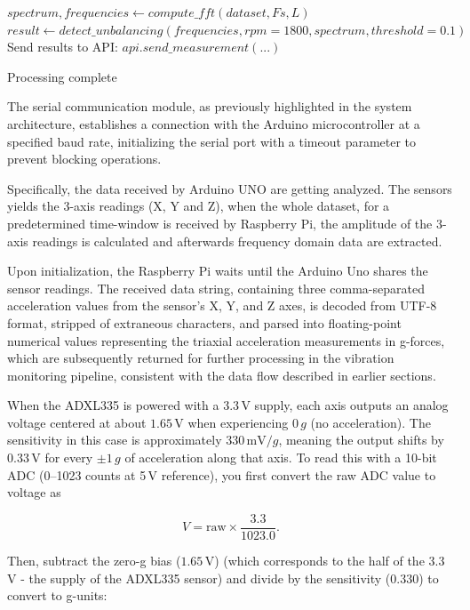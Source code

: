 {\begin{algorithm}[H]
\begin{algorithmic}[1]
			\STATE $spectrum, frequencies \gets compute\_fft(dataset, Fs, L)$
			\STATE $result \gets detect\_unbalancing(frequencies, rpm=1800, spectrum, threshold=0.1)$
			\STATE Send results to API: $api.send\_measurement(...)$
			\ENDFOR
			
			\RETURN Processing complete
		\end{algorithmic}
	\end{algorithm}


	
	The serial communication module, as previously highlighted in the system architecture, establishes a connection with the Arduino microcontroller at a specified baud rate, initializing the serial port with a timeout parameter to prevent blocking operations. 
	
	Specifically, the data received by Arduino UNO are getting analyzed. The sensors yields the 3-axis readings (X, Y and Z), when the whole dataset, for a predetermined time-window is received by Raspberry Pi, the amplitude of the 3-axis readings is calculated and afterwards frequency domain data are extracted.
	
	Upon initialization, the Raspberry Pi waits until the Arduino Uno shares the sensor readings. The received data string, containing three comma-separated acceleration values from the sensor's X, Y, and Z axes, is decoded from UTF-8 format, stripped of extraneous characters, and parsed into floating-point numerical values representing the triaxial acceleration measurements in g-forces, which are subsequently returned for further processing in the vibration monitoring pipeline, consistent with the data flow described in earlier sections.
	
	When the ADXL335 is powered with a 3.3\,V supply, each axis outputs an analog voltage centered at about 
	\(1.65\,\text{V}\) when experiencing \(0\,g\) (no acceleration). The sensitivity in this case is approximately 
	\(330\,\text{mV}/g\), meaning the output shifts by \(0.33\,\text{V}\) for every \(\pm 1\,g\) of acceleration 
	along that axis. To read this with a 10-bit ADC (0--1023 counts at 5\,V reference), you first convert the raw 
	ADC value to voltage as
	
	\[
	V = \text{raw} \times \frac{3.3}{1023.0}.
	\]
	
	Then, subtract the zero-g bias (\(1.65\,\text{V}\)) (which corresponds to the half of the 3.3\,V - the supply of the ADXL335 sensor) and divide by the sensitivity (\(0.330\)) to convert to g-units:
	
}

